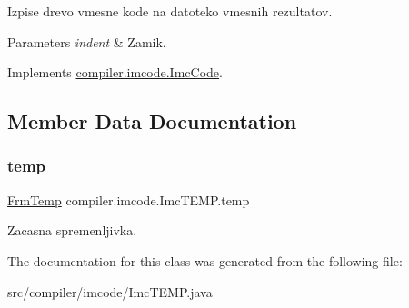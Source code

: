 Izpise drevo vmesne kode na datoteko vmesnih rezultatov.


\begin{DoxyParams}{Parameters}
{\em indent} & Zamik. \\
\hline
\end{DoxyParams}


Implements \hyperlink{interfacecompiler_1_1imcode_1_1_imc_code_a26451dea2ab4dbd7054ac33f4c6d71fe}{compiler.\+imcode.\+Imc\+Code}.



\subsection{Member Data Documentation}
\mbox{\label{classcompiler_1_1imcode_1_1_imc_t_e_m_p_a6435726b03211d4ba6cbd998ad3af0fd}} 
\subsubsection{\texorpdfstring{temp}{temp}}
{\footnotesize\ttfamily \hyperlink{classcompiler_1_1frames_1_1_frm_temp}{Frm\+Temp} compiler.\+imcode.\+Imc\+T\+E\+M\+P.\+temp}

Zacasna spremenljivka. 

The documentation for this class was generated from the following file\+:\begin{DoxyCompactItemize}
\item 
src/compiler/imcode/Imc\+T\+E\+M\+P.\+java\end{DoxyCompactItemize}

